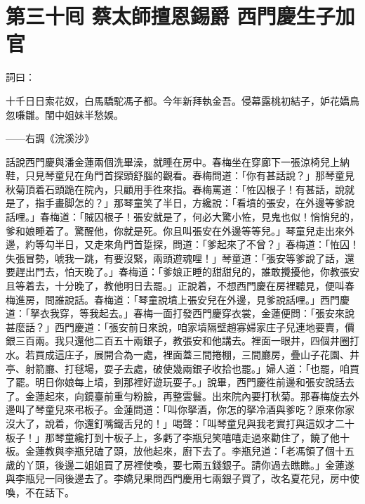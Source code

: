 
\chapter*{第三十囘 蔡太師擅恩錫爵 西門慶生子加官}


詞曰：

十千日日索花奴，白馬驕駝馮子都。今年新拜執金吾。侵幕露桃初結子，妒花嬌鳥忽嗛雛。閨中姐妹半愁娛。

——右調《浣溪沙》

話說西門慶與潘金蓮兩個洗畢澡，就睡在房中。春梅坐在穿廊下一張涼椅兒上納鞋，只見琴童兒在角門首探頭舒腦的觀看。春梅問道：「你有甚話說？」那琴童見秋菊頂着石頭跪在院內，只顧用手徃來指。{}春梅罵道：「恠囚根子！有甚話，說就是了，指手畫脚怎的？」那琴童笑了半日，方纔說：「看墳的張安，在外邊等爹說話哩。」春梅道：「賊囚根子！張安就是了，何必大驚小恠，見鬼也似！悄悄兒的，爹和娘睡着了。驚醒他，你就是死。你且叫張安在外邊等等兒。」琴童兒走出來外邊，約等勾半日，又走來角門首踅探，問道：「爹起來了不曾？」春梅道：「恠囚！失張冒勢，唬我一跳，有要沒緊，兩頭遊魂哩！」琴童道：「張安等爹說了話，還要趕出門去，怕天晚了。」春梅道：「爹娘正睡的甜甜兒的，誰敢攪擾他，你教張安且等着去，十分晚了，教他明日去罷。」正說着，不想西門慶在房裡聽見，便叫春梅進房，問誰說話。春梅道：「琴童說墳上張安兒在外邊，見爹說話哩。」西門慶道：「拏衣我穿，等我起去。」春梅一面打發西門慶穿衣裳，金蓮便問：「張安來說甚麼話？」西門慶道：「張安前日來說，咱家墳隔壁趙寡婦家庄子兒連地要賣，價銀三百兩。我只還他二百五十兩銀子，教張安和他講去。裡面一眼井，四個井圈打水。{}若買成這庄子，展開合為一處，裡面蓋三間捲棚，三間廳房，疊山子花園、井亭、射箭廳、打毬場，耍子去處，破使幾兩銀子收拾也罷。」婦人道：「也罷，咱買了罷。明日你娘每上墳，到那裡好遊玩耍子。」說畢，西門慶徃前邊和張安說話去了。金蓮起來，向鏡臺前重勻粉臉，再整雲鬟。出來院內要打秋菊。那春梅旋去外邊叫了琴童兒來弔板子。金蓮問道：「叫你拏酒，你怎的拏冷酒與爹吃？原來你家沒大了，說着，你還釘嘴鐵舌兒的！」喝聲：「叫琴童兒與我老實打與這奴才二十板子！」那琴童纔打到十板子上，多虧了李瓶兒笑嘻嘻走過來勸住了，饒了他十板。{}金蓮教與李瓶兒磕了頭，放他起來，廚下去了。李瓶兒道：「老馮領了個十五歲的丫頭，後邊二姐姐買了房裡使喚，要七兩五錢銀子。請你過去瞧瞧。」金蓮遂與李瓶兒一同後邊去了。李嬌兒果問西門慶用七兩銀子買了，改名夏花兒，房中使喚，不在話下。

